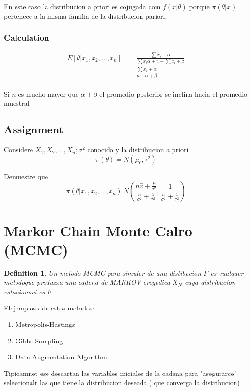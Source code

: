 \documentclass[10pt, oneside]{article}
\newtheorem{defn}{Definition}
\begin{document}
En este caso la distribucion a priori es cojugada com $f(x|\theta)$ porque $\pi(\theta|x)$ pertenece a la misma
familia de la distribucion pariori.

\subsubsection{Calculation}
\[
	\begin{split}
		E[\theta|x_1, x_2, \ldots, x_n] & = \frac{\sum x_i + \alpha}{\sum x_i \alpha + n - \sum x_i + \beta} \\
		&= \frac{\sum x_i + \alpha}{n + \alpha + \beta} \\
	\end{split}
\]

Si $n$ es mucho mayor que $\alpha + \beta$ el promedio posterior se inclina hacia el promedio muestral

\subsection{Assignment}

Considere $X_1, X_2, \ldots, X_n; \sigma^2$ conocido y la distribucion a priori
\[
	\pi(\theta) = N(\mu_0, \tau^2)
\]

Demuestre que
\[
	\pi(\theta|x_1, x_2, \ldots, x_n) ~ N(\frac{n\hat{x} + \frac{\mu}{\tau^2}}{\frac{n}{\sigma^2} +\frac{1}{\tau^2}}, \frac{1}{\frac{n}{\sigma^2} +\frac{1}{\tau^2}})
\]


\section{Markor Chain Monte Calro (MCMC)}

\begin{defn}
	Un metodo MCMC para simular de una distibucion $F$ es cualquer metodoque
	produzxa una cadena de MARKOV erogodica $X_N$ cuya distribucion
	estacionari es $F$
\end{defn}

Elejemplos dde estos metodos:
\begin{enumerate}
	\item Metropolis-Hastings
	\item Gibbs Sampling
	\item Data Augmentation Algorithm
\end{enumerate}

Tipicamnet ese descartan las variables iniciales de la cadena para "asegurarce"
seleccionalr las que tiene la distribucion deseada.( que converga la distribucion)
\end{document}
